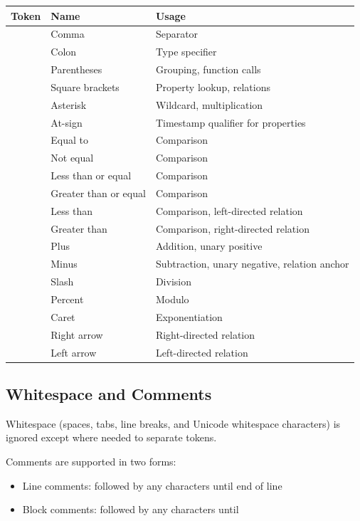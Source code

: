 \begin{center}
\begin{tabular}{lll}
\toprule
Token & Name & Usage \\
\midrule
\term{,} & Comma & Separator \\
\term{:} & Colon & Type specifier \\
\term{(} \term{)} & Parentheses & Grouping, function calls \\
\term{[} \term{]} & Square brackets & Property lookup, relations \\
\term{*} & Asterisk & Wildcard, multiplication \\
\term{@} & At-sign & Timestamp qualifier for properties \\
\term{==} & Equal to & Comparison \\
\term{!=} & Not equal & Comparison \\
\term{<=} & Less than or equal & Comparison \\
\term{>=} & Greater than or equal & Comparison \\
\term{<} & Less than & Comparison, left-directed relation \\
\term{>} & Greater than & Comparison, right-directed relation \\
\term{+} & Plus & Addition, unary positive \\
\term{-} & Minus & Subtraction, unary negative, relation anchor \\
\term{/} & Slash & Division \\
\term{\%} & Percent & Modulo \\
\term{\textasciicircum} & Caret & Exponentiation \\
\term{->} & Right arrow & Right-directed relation \\
\term{<-} & Left arrow & Left-directed relation \\
\bottomrule
\end{tabular}
\end{center}

\subsection{Whitespace and Comments}

Whitespace (spaces, tabs, line breaks, and Unicode whitespace characters) is ignored except where needed to separate tokens.

Comments are supported in two forms:
\begin{itemize}
    \item Line comments: \term{//} followed by any characters until end of line
    \item Block comments: \term{/*} followed by any characters until \term{*/}
\end{itemize}
